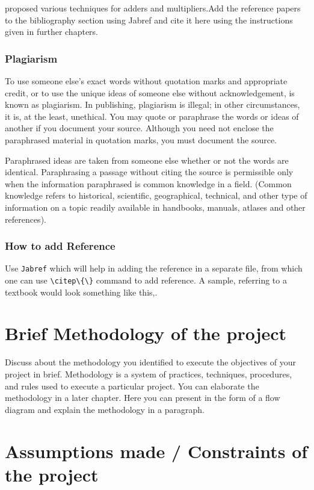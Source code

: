  proposed various techniques for adders and multipliers.Add the reference papers to the bibliography section using Jabref and cite it here using the instructions given in further chapters.


\subsubsection{\textbf{Plagiarism}}

To use someone else's exact words without quotation marks and appropriate credit, or to use the unique ideas of someone else without acknowledgement, is known as plagiarism. In publishing, plagiarism is illegal; in other circumstances, it is, at the least, unethical. You may quote or paraphrase the words or ideas of another if you document your source. Although you need not enclose the paraphrased material in quotation marks, you must document the source. 

Paraphrased ideas are taken from someone else whether or not the words are identical. Paraphrasing a passage without citing the source is permissible only when the information paraphrased is common knowledge in a field. (Common knowledge refers to historical, scientific, geographical, technical, and other type of information on a topic readily available in handbooks, manuals, atlases and other references). 

\subsubsection{How to add Reference}
Use \texttt{Jabref} which will help in adding the reference in a separate file, from which one can use \verb|\citep\{\}| command to add reference. A sample, referring to a textbook would look something like this,\cite{Razavi2000}.

\section[Brief Methodology of the project]{\textbf{Brief Methodology of the project}}
Discuss about the methodology you identified to execute the objectives of your project in brief. Methodology is a system of practices, techniques, procedures, and rules used to execute a particular project. You can elaborate the methodology in a later chapter. Here you can present in the form of a flow diagram and explain the methodology in a paragraph.

\section[Assumptions made / Constraints of the project]{\textbf{Assumptions made / Constraints of the project}}

